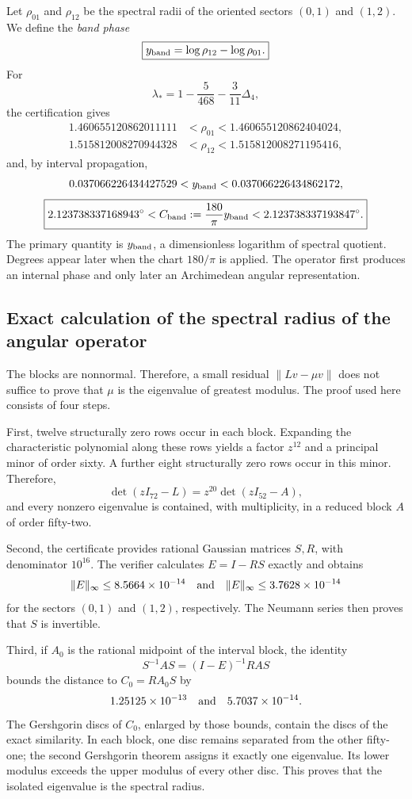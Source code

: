 Let \(\rho_{01}\) and \(\rho_{12}\) be the spectral radii of the oriented
sectors \((0,1)\) and \((1,2)\). We define the \emph{band phase}
\[
 \boxed{y_{\rm band}=\log\rho_{12}-\log\rho_{01}.}
\]
For
\[
 \lambda_*
 =1-\frac5{468}-\frac3{11}\Delta_4,
\]
the certification gives
\[
\begin{aligned}
1.460655120862011111
&<\rho_{01}<1.460655120862404024,\\
1.515812008270944328
&<\rho_{12}<1.515812008271195416,
\end{aligned}
\]
and, by interval propagation,
\[
 0.037066226434427529
 <y_{\rm band}<
 0.037066226434862172,
\]
\[
 \boxed{
 2.123738337168943^\circ
 <C_{\rm band}:=\frac{180}{\pi}y_{\rm band}
 <2.123738337193847^\circ.}
\]
The primary quantity is \(y_{\rm band}\), a dimensionless logarithm of spectral
quotient. Degrees appear later when the chart
\(180/\pi\) is applied. The operator first produces an internal phase and only later
an Archimedean angular representation.

\subsection{Exact calculation of the spectral radius of the angular operator}

The blocks are nonnormal. Therefore, a small residual
\(\|Lv-\mu v\|\) does not suffice to prove that \(\mu\) is the eigenvalue of
greatest modulus. The proof used here consists of four steps.

First, twelve structurally zero rows occur in each block. Expanding the
characteristic polynomial along these rows yields a factor
\(z^{12}\) and a principal minor of order sixty. A further
eight structurally zero rows occur in this minor. Therefore,
\[
 \det(zI_{72}-L)=z^{20}\det(zI_{52}-A),
\]
and every nonzero eigenvalue is contained, with multiplicity, in a
reduced block \(A\) of order fifty-two.

Second, the certificate provides rational Gaussian matrices
\(S,R\), with denominator \(10^{16}\). The verifier calculates
\(E=I-RS\) exactly and obtains
\[
 \|E\|_\infty\le8.5664\times10^{-14}
 \quad\hbox{and}\quad
 \|E\|_\infty\le3.7628\times10^{-14}
\]
for the sectors \((0,1)\) and \((1,2)\), respectively. The Neumann
series then proves that \(S\) is invertible.

Third, if \(A_0\) is the rational midpoint of the interval block, the
identity
\[
 S^{-1}AS=(I-E)^{-1}RAS
\]
bounds the distance to \(C_0=RA_0S\) by
\[
 1.25125\times10^{-13}
 \quad\hbox{and}\quad
 5.7037\times10^{-14}.
\]
The Gershgorin discs of \(C_0\), enlarged by those bounds, contain
the discs of the exact similarity. In each block, one disc remains separated
from the other fifty-one; the second Gershgorin theorem assigns it
exactly one eigenvalue. Its lower modulus exceeds the upper modulus of
every other disc. This proves that the isolated eigenvalue is the
spectral radius.

